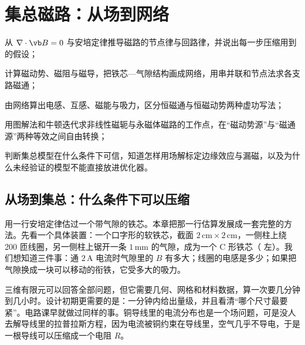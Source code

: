 \chapter{集总磁路：从场到网络}\label{ch:lumped}

\begin{chapterguide}
\begin{guidegoals}
\item 从 $\nabla\cdot\vb B=0$ 与安培定律推导磁路的节点律与回路律，并说出每一步压缩用到的假设；
\item 计算磁动势、磁阻与磁导，把铁芯—气隙结构画成网络，用串并联和节点法求各支路磁通；
\item 由网络算出电感、互感、磁能与吸力，区分恒磁通与恒磁动势两种虚功写法；
\item 用图解法和牛顿迭代求非线性磁轭与永磁体磁路的工作点，在“磁动势源”与“磁通源”两种等效之间自由转换；
\item 判断集总模型在什么条件下可信，知道怎样用场解标定边缘效应与漏磁，以及为什么未经验证的模型不能直接放进优化器。
\end{guidegoals}
\end{chapterguide}

\section{从场到集总：什么条件下可以压缩}\label{sec:lumped-fromfield}

 用一行安培定律估过一个带气隙的铁芯。本章把那一行估算发展成一套完整的方法。先看一个具体装置：一个口字形的软铁芯，截面 $2\,\mathrm{cm}\times2\,\mathrm{cm}$，一侧柱上绕 200 匝线圈，另一侧柱上锯开一条 $1\,\mathrm{mm}$ 的气隙，成为一个 C 形铁芯（ 左）。我们想知道三件事：通 $2\,\mathrm A$ 电流时气隙里的 $B$ 有多大；线圈的电感是多少；如果把气隙换成一块可以移动的衔铁，它受多大的吸力。

三维有限元可以回答全部问题，但它需要几何、网格和材料数据，算一次要几分钟到几小时。设计初期更需要的是：一分钟内给出量级，并且看清“哪个尺寸最要紧”。电路课早就做过同样的事。铜导线里的电流分布也是一个场问题，可是没人去解导线里的拉普拉斯方程，因为电流被铜约束在导线里，空气几乎不导电，于是一根导线可以压缩成一个电阻 $R$。

